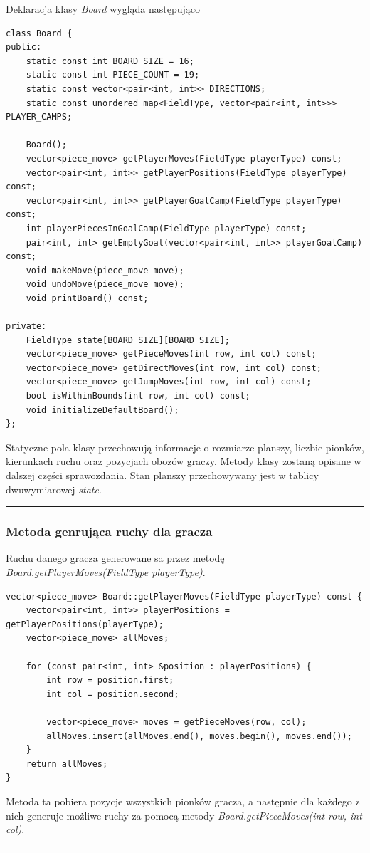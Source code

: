 \documentclass[a4paper, 12pt]{article}
\begin{document}
Deklaracja klasy \textit{Board} wygląda następująco
\begin{lstlisting}
class Board {
public:
    static const int BOARD_SIZE = 16;
    static const int PIECE_COUNT = 19;
    static const vector<pair<int, int>> DIRECTIONS;
    static const unordered_map<FieldType, vector<pair<int, int>>> PLAYER_CAMPS;

    Board();
    vector<piece_move> getPlayerMoves(FieldType playerType) const;
    vector<pair<int, int>> getPlayerPositions(FieldType playerType) const;
    vector<pair<int, int>> getPlayerGoalCamp(FieldType playerType) const;
    int playerPiecesInGoalCamp(FieldType playerType) const;
    pair<int, int> getEmptyGoal(vector<pair<int, int>> playerGoalCamp) const;
    void makeMove(piece_move move);
    void undoMove(piece_move move);
    void printBoard() const;

private:
    FieldType state[BOARD_SIZE][BOARD_SIZE];
    vector<piece_move> getPieceMoves(int row, int col) const;
    vector<piece_move> getDirectMoves(int row, int col) const;
    vector<piece_move> getJumpMoves(int row, int col) const;
    bool isWithinBounds(int row, int col) const;
    void initializeDefaultBoard();
};
\end{lstlisting}
Statyczne pola klasy przechowują informacje o 
rozmiarze planszy, liczbie pionków, kierunkach ruchu oraz
pozycjach obozów graczy. Metody klasy zostaną opisane w dalszej
części sprawozdania. 
Stan planszy przechowywany jest w tablicy dwuwymiarowej \textit{state}.
\vspace{0.5cm}
\hrule
\vspace{1cm}

\subsubsection{Metoda genrująca ruchy dla gracza}
Ruchu danego gracza generowane sa przez metodę 
\textit{Board.getPlayerMoves(FieldType playerType)}.
\begin{lstlisting}
vector<piece_move> Board::getPlayerMoves(FieldType playerType) const {
    vector<pair<int, int>> playerPositions = getPlayerPositions(playerType);
    vector<piece_move> allMoves;

    for (const pair<int, int> &position : playerPositions) {
        int row = position.first;
        int col = position.second;

        vector<piece_move> moves = getPieceMoves(row, col);
        allMoves.insert(allMoves.end(), moves.begin(), moves.end());
    }
    return allMoves;
}
\end{lstlisting}
Metoda ta pobiera pozycje wszystkich pionków gracza, 
a następnie dla każdego z nich generuje możliwe ruchy
za pomocą metody \textit{Board.getPieceMoves(int row, int col)}.
\vspace{0.5cm}
\hrule
\vspace{1cm}
\end{document}
